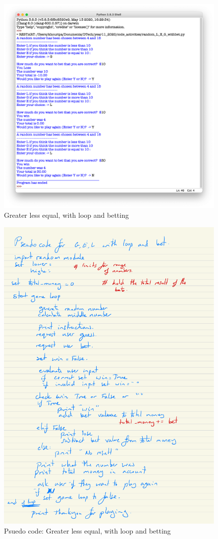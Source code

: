 \documentclass[a4paper,12pt]{article}
\begin{document}
\begin{figure} [!h]
	\centering
	\includegraphics[width=15cm]{iterative_processes/random_L_E_G_withbet.png}
	\caption*{Greater less equal, with loop and betting}
\end{figure}
\newpage
\begin{figure} [!h]
	\centering
	\includegraphics[width=17cm]{iterative_processes/random_L_E_G_withbet.pdf}
	\caption*{Psuedo code: Greater less equal, with loop and betting}
\end{figure}
\end{document}

